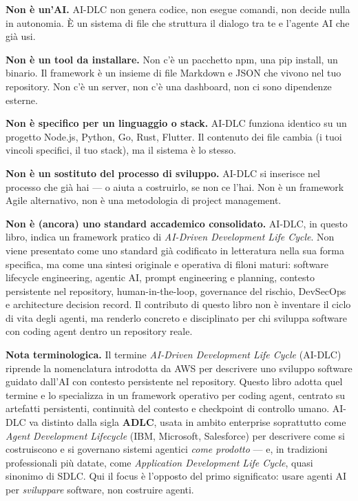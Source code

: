\textbf{Non è un'AI.} AI-DLC non genera codice, non esegue comandi, non decide nulla in autonomia. È un sistema di file che struttura il dialogo tra te e l'agente AI che già usi.

\textbf{Non è un tool da installare.} Non c'è un pacchetto npm, una pip install, un binario. Il framework è un insieme di file Markdown e JSON che vivono nel tuo repository. Non c'è un server, non c'è una dashboard, non ci sono dipendenze esterne.

\textbf{Non è specifico per un linguaggio o stack.} AI-DLC funziona identico su un progetto Node.js, Python, Go, Rust, Flutter. Il contenuto dei file cambia (i tuoi vincoli specifici, il tuo stack), ma il sistema è lo stesso.

\textbf{Non è un sostituto del processo di sviluppo.} AI-DLC si inserisce nel processo che già hai --- o aiuta a costruirlo, se non ce l'hai. Non è un framework Agile alternativo, non è una metodologia di project management.

\textbf{Non è (ancora) uno standard accademico consolidato.} AI-DLC, in questo libro, indica un framework pratico di \textit{AI-Driven Development Life Cycle}. Non viene presentato come uno standard già codificato in letteratura nella sua forma specifica, ma come una sintesi originale e operativa di filoni maturi: software lifecycle engineering, agentic AI, prompt engineering e planning, contesto persistente nel repository, human-in-the-loop, governance del rischio, DevSecOps e architecture decision record. Il contributo di questo libro non è inventare il ciclo di vita degli agenti, ma renderlo concreto e disciplinato per chi sviluppa software con coding agent dentro un repository reale.

\begin{notebox}
\textbf{Nota terminologica.} Il termine \textit{AI-Driven Development Life Cycle} (AI-DLC) riprende la nomenclatura introdotta da AWS per descrivere uno sviluppo software guidato dall'AI con contesto persistente nel repository. Questo libro adotta quel termine e lo specializza in un framework operativo per coding agent, centrato su artefatti persistenti, continuità del contesto e checkpoint di controllo umano. AI-DLC va distinto dalla sigla \textbf{ADLC}, usata in ambito enterprise soprattutto come \textit{Agent Development Lifecycle} (IBM, Microsoft, Salesforce) per descrivere come si costruiscono e si governano sistemi agentici \textit{come prodotto} --- e, in tradizioni professionali più datate, come \textit{Application Development Life Cycle}, quasi sinonimo di SDLC. Qui il focus è l'opposto del primo significato: usare agenti AI per \textit{sviluppare} software, non costruire agenti.
\end{notebox}

